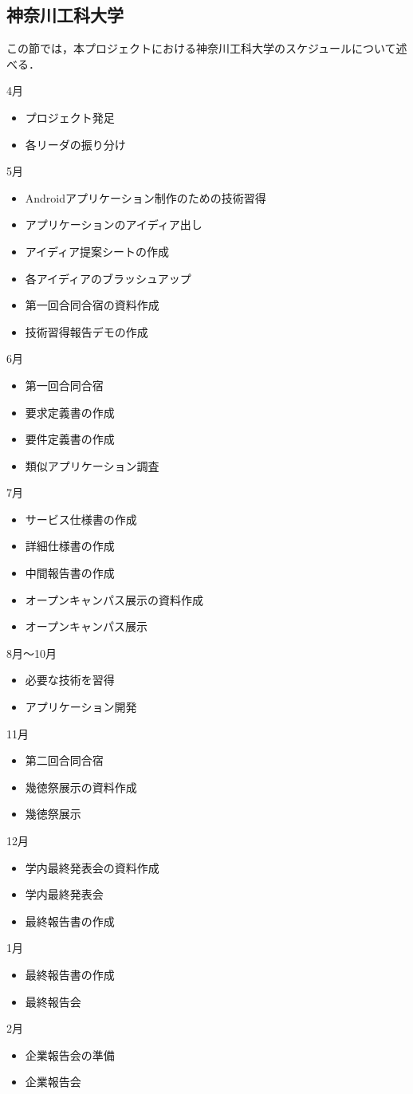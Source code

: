 \subsection{神奈川工科大学}
\par この節では，本プロジェクトにおける神奈川工科大学のスケジュールについて述べる．

4月
\begin{itemize}
\item プロジェクト発足
\item 各リーダの振り分け
\end{itemize}
5月
\begin{itemize}
\item Androidアプリケーション制作のための技術習得
\item アプリケーションのアイディア出し
\item アイディア提案シートの作成
\item 各アイディアのブラッシュアップ
\item 第一回合同合宿の資料作成
\item 技術習得報告デモの作成
\end{itemize}
6月
\begin{itemize}
\item 第一回合同合宿
\item 要求定義書の作成
\item 要件定義書の作成
\item 類似アプリケーション調査
\end{itemize}
7月
\begin{itemize}
\item サービス仕様書の作成
\item 詳細仕様書の作成
\item 中間報告書の作成
\item オープンキャンパス展示の資料作成
\item オープンキャンパス展示
\end{itemize}
8月～10月
\begin{itemize}
\item 必要な技術を習得
\item アプリケーション開発
\end{itemize}
11月
\begin{itemize}
\item 第二回合同合宿
\item 幾徳祭展示の資料作成
\item 幾徳祭展示
\end{itemize}
12月
\begin{itemize}
\item 学内最終発表会の資料作成
\item 学内最終発表会
\item 最終報告書の作成
\end{itemize}
1月
\begin{itemize}
\item 最終報告書の作成
\item 最終報告会
\end{itemize}
2月
\begin{itemize}
\item 企業報告会の準備
\item 企業報告会
\end{itemize}

